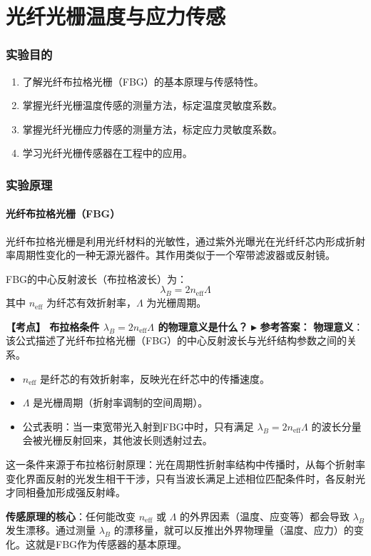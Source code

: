 \documentclass[12pt,a4paper]{article}
\newcommand{\exam}[1]{\textbf{\color{blue!70!black}【考点】#1}}
\newcommand{\answer}[1]{\vspace{2pt}\noindent\textbf{\color{teal!80!black}▸ 参考答案：}#1\vspace{4pt}}
\newcommand{\qa}[2]{\exam{#1}\answer{#2}}
\begin{document}
\newpage

\part{光纤光栅温度与应力传感}

\section{实验目的}
\begin{enumerate}
    \item 了解光纤布拉格光栅（FBG）的基本原理与传感特性。
    \item 掌握光纤光栅温度传感的测量方法，标定温度灵敏度系数。
    \item 掌握光纤光栅应力传感的测量方法，标定应力灵敏度系数。
    \item 学习光纤光栅传感器在工程中的应用。
\end{enumerate}

\section{实验原理}

\subsection{光纤布拉格光栅（FBG）}
光纤布拉格光栅是利用光纤材料的光敏性，通过紫外光曝光在光纤纤芯内形成折射率周期性变化的一种无源光器件。其作用类似于一个窄带滤波器或反射镜。

FBG的中心反射波长（布拉格波长）为：
\begin{equation}
    \lambda_B = 2n_{\text{eff}} \Lambda
\end{equation}
其中 \(n_{\text{eff}}\) 为纤芯有效折射率，\(\Lambda\) 为光栅周期。

\qa{
    布拉格条件 $\lambda_B = 2n_{\text{eff}}\Lambda$ 的物理意义是什么？
}{
    \textbf{物理意义}：该公式描述了光纤布拉格光栅（FBG）的中心反射波长与光纤结构参数之间的关系。
    \begin{itemize}
        \item $n_{\text{eff}}$ 是纤芯的有效折射率，反映光在纤芯中的传播速度。
        \item $\Lambda$ 是光栅周期（折射率调制的空间周期）。
        \item 公式表明：当一束宽带光入射到FBG中时，只有满足 $\lambda_B = 2n_{\text{eff}}\Lambda$ 的波长分量会被光栅反射回来，其他波长则透射过去。
    \end{itemize}
    这一条件来源于布拉格衍射原理：光在周期性折射率结构中传播时，从每个折射率变化界面反射的光发生相干干涉，只有当波长满足上述相位匹配条件时，各反射光才同相叠加形成强反射峰。

    \textbf{传感原理的核心}：任何能改变 $n_{\text{eff}}$ 或 $\Lambda$ 的外界因素（温度、应变等）都会导致 $\lambda_B$ 发生漂移。通过测量 $\lambda_B$ 的漂移量，就可以反推出外界物理量（温度、应力）的变化。这就是FBG作为传感器的基本原理。
}
\end{document}
